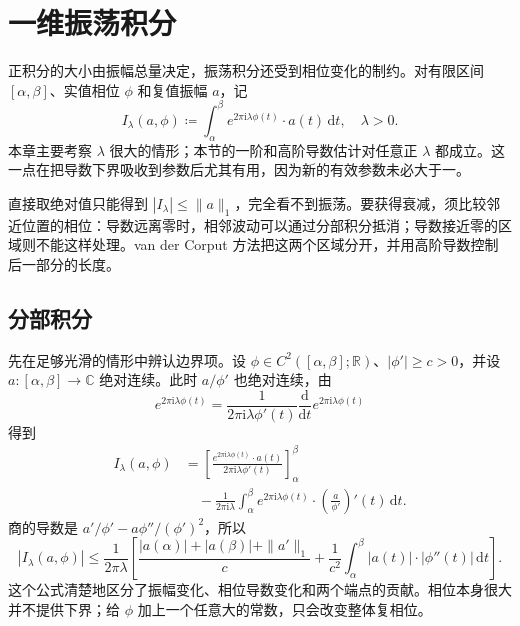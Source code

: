 \section{一维振荡积分}
\label{b2:sec:2101}

正积分的大小由振幅总量决定，振荡积分还受到相位变化的制约。对有限区间 \([\alpha,\beta]\)、实值相位 \(\phi\) 和复值振幅 \(a\)，记
\[
 I_\lambda(a,\phi)
 \coloneqq\int_\alpha^\beta
 e^{2\pi\mathrm i\lambda\phi(t)}\cdot a(t)\,\mathrm dt,
 \quad \lambda>0.
\]
本章主要考察 \(\lambda\) 很大的情形；本节的一阶和高阶导数估计对任意正 \(\lambda\) 都成立。这一点在把导数下界吸收到参数后尤其有用，因为新的有效参数未必大于一。

\ProseParagraphBreak

直接取绝对值只能得到 \(|I_\lambda|\leq\|a\|_1\)，完全看不到振荡。要获得衰减，须比较邻近位置的相位：导数远离零时，相邻波动可以通过分部积分抵消；导数接近零的区域则不能这样处理。van der Corput 方法把这两个区域分开，并用高阶导数控制后一部分的长度。

\subsection{分部积分}
\label{b2:subsec:210101}

先在足够光滑的情形中辨认边界项。设 \(\phi\in C^2([\alpha,\beta];\mathbb R)\)、\(|\phi'|\geq c>0\)，并设 \(a:[\alpha,\beta]\to\mathbb C\) 绝对连续。此时 \(a/\phi'\) 也绝对连续，由
\[
 e^{2\pi\mathrm i\lambda\phi(t)}
 =\frac1{2\pi\mathrm i\lambda\phi'(t)}
   \frac{\mathrm d}{\mathrm dt}e^{2\pi\mathrm i\lambda\phi(t)}
\]
得到
\[
 \begin{aligned}
 I_\lambda(a,\phi)
 &=\left[
 \frac{e^{2\pi\mathrm i\lambda\phi(t)}\cdot a(t)}
      {2\pi\mathrm i\lambda\phi'(t)}
 \right]_\alpha^\beta\\
 &\hspace{1em}
 -\frac1{2\pi\mathrm i\lambda}
 \int_\alpha^\beta e^{2\pi\mathrm i\lambda\phi(t)}
       \cdot\left(\frac a{\phi'}\right)'(t)\,\mathrm dt.
 \end{aligned}
\]
商的导数是 \(a'/\phi'-a\phi''/(\phi')^2\)，所以
\[
 |I_\lambda(a,\phi)|
 \leq\frac1{2\pi\lambda}
 \left[
 \frac{|a(\alpha)|+|a(\beta)|+\|a'\|_1}{c}
 +\frac1{c^2}\int_\alpha^\beta|a(t)|\cdot|\phi''(t)|\,\mathrm dt
 \right].
\]
这个公式清楚地区分了振幅变化、相位导数变化和两个端点的贡献。相位本身很大并不提供下界；给 \(\phi\) 加上一个任意大的常数，只会改变整体复相位。

\ProseParagraphBreak

